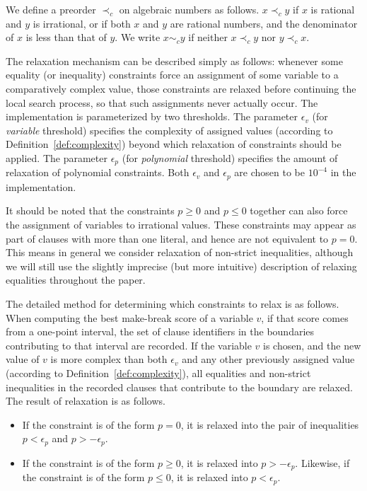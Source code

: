 \documentclass[runningheads]{llncs}
\begin{document}
\begin{definition}
\label{def:complexity}
We define a preorder $\prec_c$ on algebraic numbers as follows. $x\prec_c y$ if $x$ is rational and $y$ is irrational, or if both $x$ and $y$ are rational numbers, and the denominator of $x$ is less than that of $y$. We write $x \sim_c y$ if neither $x\prec_c y$ nor $y\prec_c x$.
\end{definition}

The relaxation mechanism can be described simply as follows: whenever some equality (or inequality) constraints force an assignment of some variable to a comparatively complex value, those constraints are relaxed before continuing the local search process, so that such assignments never actually occur. The implementation is parameterized by two thresholds. The parameter $\epsilon_v$ (for \emph{variable} threshold) specifies the complexity of assigned values (according to Definition~\ref{def:complexity}) beyond which relaxation of constraints should be applied. The parameter $\epsilon_p$ (for \emph{polynomial} threshold) specifies the amount of relaxation of polynomial constraints. Both $\epsilon_v$ and $\epsilon_p$ are chosen to be $10^{-4}$ in the implementation.

It should be noted that the constraints $p\ge 0$ and $p\le 0$ together can also force the assignment of variables to irrational values. These constraints may appear as part of clauses with more than one literal, and hence are not equivalent to $p=0$. This means in general we consider relaxation of non-strict inequalities, although we will still use the slightly imprecise (but more intuitive) description of relaxing equalities throughout the paper. 

The detailed method for determining which constraints to relax is as follows. When computing the best make-break score of a variable $v$, if that score comes from a one-point interval, the set of clause identifiers in the boundaries contributing to that interval are recorded. If the variable $v$ is chosen, and the new value of $v$ is more complex than both $\epsilon_v$ and any other previously assigned value (according to Definition~\ref{def:complexity}), all equalities and non-strict inequalities in the recorded clauses that contribute to the boundary are relaxed. The result of relaxation is as follows.
\begin{itemize}
    \item If the constraint is of the form $p=0$, it is relaxed into the pair of inequalities $p<\epsilon_p$ and $p>-\epsilon_p$.

    \item If the constraint is of the form $p\ge 0$, it is relaxed into $p>-\epsilon_p$. Likewise, if the constraint is of the form $p\le 0$, it is relaxed into $p<\epsilon_p$.
\end{itemize}
\end{document}
